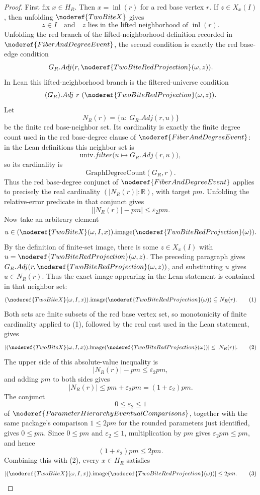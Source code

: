 \begin{proof}
First fix \(x\in H_R\).  Then \(x=\operatorname{inl}(r)\) for a red base
vertex \(r\).  If \(z\in X_x(I)\), then unfolding \(\noderef{TwoBiteX}\) gives
\[
z\in I
\quad\text{and}\quad
z\text{ lies in the lifted neighborhood of }\operatorname{inl}(r).
\]
Unfolding the red branch of the lifted-neighborhood definition recorded in
\(\noderef{FiberAndDegreeEvent}\), the second condition is exactly the red
base-edge condition
\[
G_R.Adj(r,\noderef{TwoBiteRedProjection}(\omega,z)).
\]
In Lean this lifted-neighborhood branch is the filtered-universe condition
\[
(G_R).Adj\ r\ (\noderef{TwoBiteRedProjection}(\omega,z)).
\]
Let
\[
N_R(r)=\{u:\ G_R.Adj(r,u)\}
\]
be the finite red base-neighbor set.  Its cardinality is exactly the finite
degree count used in the red base-degree clause of
\(\noderef{FiberAndDegreeEvent}\): in the Lean definitions this neighbor set
is
\[
\mathrm{univ}.filter\bigl(u\mapsto G_R.Adj(r,u)\bigr),
\]
so its cardinality is
\[
\mathrm{GraphDegreeCount}(G_R,r).
\]
Thus the red base-degree conjunct of \(\noderef{FiberAndDegreeEvent}\) applies
to precisely the real cardinality \((|N_R(r)|:\mathbb R)\), with target
\(pm\).  Unfolding the relative-error predicate in that conjunct gives
\[
\bigl||N_R(r)|-pm\bigr|\le\varepsilon_2pm.
\]
Now take an arbitrary element
\[
u\in(\noderef{TwoBiteX}(\omega,I,x)).\mathrm{image}
      (\noderef{TwoBiteRedProjection}(\omega)).
\]
By the definition of finite-set image, there is some \(z\in X_x(I)\) with
\(u=\noderef{TwoBiteRedProjection}(\omega,z)\).  The preceding paragraph gives
\(G_R.Adj(r,\noderef{TwoBiteRedProjection}(\omega,z))\), and substituting
\(u\) gives \(u\in N_R(r)\).  Thus the exact image appearing in the Lean
statement is contained in that neighbor set:
\[
(\noderef{TwoBiteX}(\omega,I,x)).\mathrm{image}
      (\noderef{TwoBiteRedProjection}(\omega))
  \subseteq N_R(r). \tag{1}
\]
Both sets are finite subsets of the red base vertex set, so monotonicity of
finite cardinality applied to (1), followed by the real cast used in the Lean
statement, gives
\[
|(\noderef{TwoBiteX}(\omega,I,x)).\mathrm{image}
      (\noderef{TwoBiteRedProjection}(\omega))|
\le |N_R(r)|. \tag{2}
\]
The upper side of this absolute-value inequality is
\[
|N_R(r)|-pm\le\varepsilon_2pm,
\]
and adding \(pm\) to both sides gives
\[
|N_R(r)|\le pm+\varepsilon_2pm=(1+\varepsilon_2)pm.
\]
The conjunct
\[
0\le\varepsilon_2\le1
\]
of \(\noderef{ParameterHierarchyEventualComparisons}\), together with the
same package's comparison \(1\le2pm\) for the rounded parameters just
identified, gives \(0\le pm\).  Since \(0\le pm\) and \(\varepsilon_2\le1\),
multiplication by \(pm\) gives \(\varepsilon_2pm\le pm\), and hence
\[
(1+\varepsilon_2)pm\le 2pm.
\]
Combining this with (2), every \(x\in H_R\) satisfies
\[
|(\noderef{TwoBiteX}(\omega,I,x)).\mathrm{image}
      (\noderef{TwoBiteRedProjection}(\omega))|
\le 2pm. \tag{3}
\]


\end{proof}
